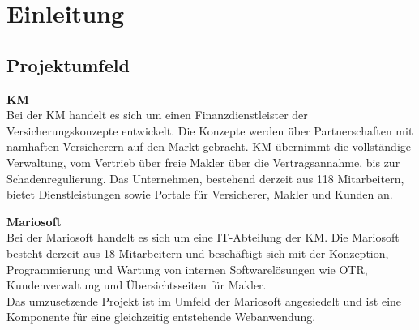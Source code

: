 
\section{Einleitung}
\label{einleitung}

\subsection{Projektumfeld}
\label{projektumfeld}
\textbf{\acl{KM}}
\\
Bei der \ac{KM} handelt es sich um einen Finanzdienstleister der Versicherungskonzepte entwickelt. Die Konzepte werden über Partnerschaften mit namhaften Versicherern auf den Markt gebracht. \ac{KM} übernimmt die vollständige Verwaltung, vom Vertrieb über freie Makler über die Vertragsannahme, bis zur Schadenregulierung.
Das Unternehmen, bestehend derzeit aus 118 Mitarbeitern, bietet Dienstleistungen sowie Portale für Versicherer, Makler und Kunden an.

\textbf{Mariosoft}
\\
Bei der Mariosoft handelt es sich um eine IT-Abteilung der \ac{KM}. Die Mariosoft besteht derzeit aus 18 Mitarbeitern und beschäftigt sich mit der Konzeption, Programmierung und Wartung von internen Softwarelösungen wie \ac{OTR}, Kundenverwaltung und Übersichtsseiten für Makler.
\\
Das umzusetzende Projekt ist im Umfeld der Mariosoft angesiedelt und ist eine Komponente für eine gleichzeitig entstehende Webanwendung.

